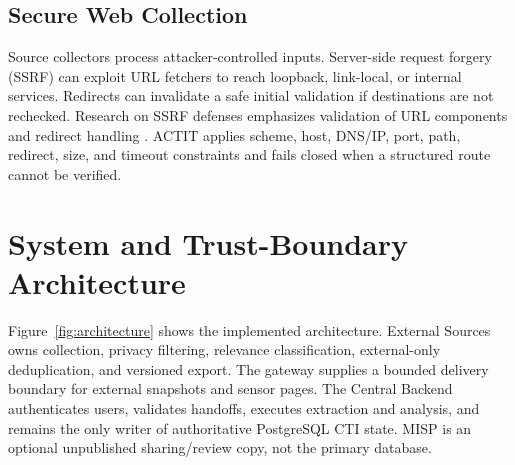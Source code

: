\documentclass[conference]{IEEEtran}
\begin{document}
\subsection{Secure Web Collection}
Source collectors process attacker-controlled inputs. Server-side request forgery (SSRF) can exploit URL fetchers to reach loopback, link-local, or internal services. Redirects can invalidate a safe initial validation if destinations are not rechecked. Research on SSRF defenses emphasizes validation of URL components and redirect handling \cite{wessels2024ssrf}. ACTIT applies scheme, host, DNS/IP, port, path, redirect, size, and timeout constraints and fails closed when a structured route cannot be verified.

\section{System and Trust-Boundary Architecture}
Figure~\ref{fig:architecture} shows the implemented architecture. External Sources owns collection, privacy filtering, relevance classification, external-only deduplication, and versioned export. The gateway supplies a bounded delivery boundary for external snapshots and sensor pages. The Central Backend authenticates users, validates handoffs, executes extraction and analysis, and remains the only writer of authoritative PostgreSQL CTI state. MISP is an optional unpublished sharing/review copy, not the primary database.
\end{document}

